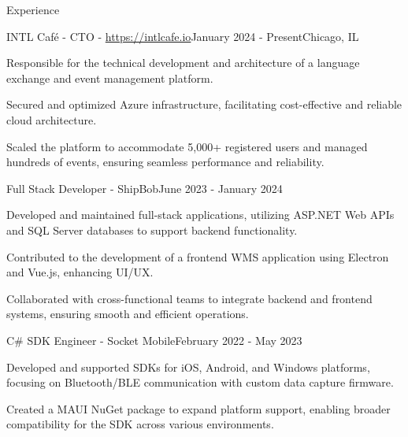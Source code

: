 \documentclass[
	10pt, %
]{resume} %
\begin{document}

\begin{rSection}{Experience}

	\begin{rSubsection}{INTL Café - CTO - \url{https://intlcafe.io}}{January 2024 - Present}{}{Chicago, IL}
		\item Responsible for the technical development and architecture of a language exchange and event management platform.
		\item Secured and optimized Azure infrastructure, facilitating cost-effective and reliable cloud architecture.
		\item Scaled the platform to accommodate 5,000+ registered users and managed hundreds of events, ensuring seamless performance and reliability.		
	\end{rSubsection}


	\begin{rSubsection}{Full Stack Developer - ShipBob}{June 2023 - January 2024}{}{}
		\item Developed and maintained full-stack applications, utilizing ASP.NET Web APIs and SQL Server databases to support backend functionality.
		\item Contributed to the development of a frontend WMS application using Electron and Vue.js, enhancing UI/UX.
		\item Collaborated with cross-functional teams to integrate backend and frontend systems, ensuring smooth and efficient operations.	
	\end{rSubsection}


	\begin{rSubsection}{C\# SDK Engineer - Socket Mobile}{February 2022 - May 2023}{}{}
		\item Developed and supported SDKs for iOS, Android, and Windows platforms, focusing on Bluetooth/BLE communication with custom data capture firmware.
		\item Created a MAUI NuGet package to expand platform support, enabling broader compatibility for the SDK across various environments.
	\end{rSubsection}


\end{rSection}
\end{document}
